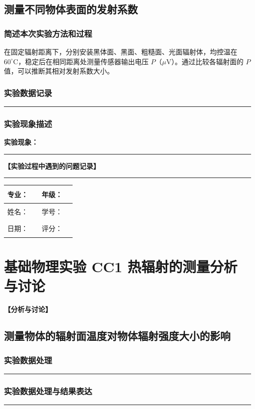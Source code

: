 \documentclass[dvipsnames, svgnames,a4paper,11pt]{article}
\newcommand{\recordblank}[1]{%
  \par\noindent\rule{0.95\linewidth}{0pt}\rule{0pt}{#1}\par}
\begin{document}
\subsection{测量不同物体表面的发射系数}
\subsubsection{简述本次实验方法和过程}

在固定辐射距离下，分别安装黑体面、黑面、粗糙面、光面辐射体，均控温在 $60^\circ\mathrm{C}$，稳定后在相同距离处测量传感器输出电压 $P$（$\mu$V）。通过比较各辐射面的 $P$ 值，可以推断其相对发射系数大小。

\subsubsection{实验数据记录}
\recordblank{5.5cm}
\subsubsection{实验现象描述}
\noindent\textbf{实验现象：}\par
\recordblank{4.5cm}
\textbf{【实验过程中遇到的问题记录】}
\recordblank{5cm}
\clearpage
\begin{table}
	\renewcommand\arraystretch{1.7}
	\begin{tabularx}{\textwidth}{|X|X|X|X|}
	\hline
	专业：& \rule{2.5cm}{0.4pt} & 年级：& \rule{2.5cm}{0.4pt}\\
	\hline
	姓名：& \rule{2.5cm}{0.4pt} & 学号：& \rule{3cm}{0.4pt}\\
	\hline
	日期：& \rule{3cm}{0.4pt} & 评分：& \rule{3cm}{0.4pt}\\
	\hline
	\end{tabularx}
\end{table}

\section{基础物理实验  \quad  CC1 热辐射的测量\heiti 分析与讨论}
\textbf{【分析与讨论】}
\subsection{ 测量物体的辐射面温度对物体辐射强度大小的影响}
\subsubsection{实验数据处理}
\recordblank{3.2cm}
\subsubsection{实验数据处理与结果表达}
\recordblank{3.2cm}
\end{document}
